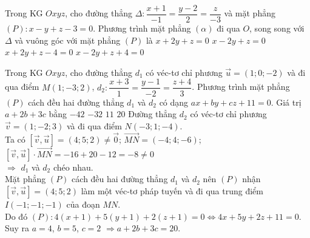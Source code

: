 \begin{ex}%
	Trong KG $Oxyz$, cho đường thẳng $\Delta\colon \dfrac{x+1}{-1}=\dfrac{y-2}{2}=\dfrac{z}{-3}$ và mặt phẳng $(P)\colon x-y+z-3=0$. Phương trình mặt phẳng $(\alpha)$ đi qua $O$, song song với $\Delta$ và vuông góc với mặt phẳng $(P)$ là
	\choice 
		{\True $x+2 y+z=0$}
		{$x-2 y+z=0$}
		{$x+2 y+z-4=0$}
		{$x-2 y+z+4=0$}
\end{ex}
\begin{ex}%
	Trong KG $Oxyz$, cho đường thẳng $d_1$ có véc-tơ chỉ phương $\overrightarrow{u}=(1;0;-2)$ và đi qua điểm $M(1;-3;2)$, $d_2\colon\dfrac{x+3}{1}=\dfrac{y-1}{-2}=\dfrac{z+4}{3}$. Phương trình mặt phẳng $(P)$ cách đều hai đường thẳng $d_1$ và $d_2$ có dạng $ax+by+cz+11=0$. Giá trị $ a+2b+3c$ bằng
	\choice
	{$-42$}
	{$-32$}
	{$ 11$}
	{\True $20$}
	\loigiai
	{
		Đường thẳng $d_2$ có véc-tơ chỉ phương $\overrightarrow{v}=(1;-2;3)$ và đi qua điểm $ N(-3;1;-4)$.\\
		Ta có $\left[\overrightarrow{v},\overrightarrow{u}\right]=(4;5;2)\ne\overrightarrow{0}$; $\overrightarrow{MN}=\left(-4;4;-6\right)$; $\left[\overrightarrow{v},\overrightarrow{u}\right]\cdot \overrightarrow{MN}=-16+20-12=-8\ne 0$\\
		$\Rightarrow $ $d_1$ và $d_2$ chéo nhau.\\
		Mặt phẳng $(P)$ cách đều hai đường thẳng $d_1$ và $d_2$ nên $(P)$ nhận $\left[\overrightarrow{v},\overrightarrow{u}\right]=(4;5;2)$ làm một véc-tơ pháp tuyến và đi qua trung điểm $ I(-1;-1;-1)$ của đoạn $ MN$.\\
		Do đó $(P)\colon 4\left(x+1\right)+5\left(y+1\right)+2\left(z+1\right)=0\Leftrightarrow 4x+5y+2z+11=0$.\\
		Suy ra $ a=4$, $b=5$, $c=2$ $\Rightarrow a+2b+3c=20$.}
\end{ex}

